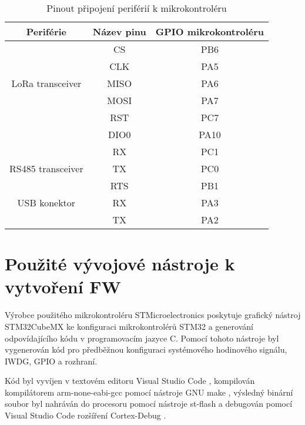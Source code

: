\begin{longtable}{ |c|c|c| }

                \caption{Pinout připojení periférií k mikrokontroléru}
                \label{table:Pinout připojení periférií k mikrokontroléru} \\
     \hline

     Periférie          & Název pinu & GPIO mikrokontroléru           \\ \hline \hline

                        & CS    &  PB6             \\
                        & CLK   &  PA5        \\
    LoRa transceiver    & MISO  &  PA6     \\
                        & MOSI  &  PA7        \\
                        & RST   & PC7          \\
                        & DIO0  & PA10         \\
                        \hline

                        & RX  &   PC1            \\
    RS485 transceiver   & TX  &   PC0       \\
                        & RTS  &  PB1      \\     \hline

    USB konektor        & RX    & PA3    \\
                        & TX    & PA2   \\          \hline


\end{longtable}



\section{Použité vývojové nástroje k vytvoření FW}
Výrobce použitého mikrokontroléru STMicroelectronics poskytuje grafický nástroj STM32CubeMX \cite{stm32cubemx} ke konfiguraci mikrokontrolérů STM32 a generování odpovídajícího kódu v programovacím jazyce C.
Pomocí tohoto nástroje byl vygenerován kód pro předběžnou konfiguraci systémového hodinového signálu, IWDG, GPIO a rozhraní.

Kód byl vyvíjen v textovém editoru Visual Studio Code \cite{vscode}, kompilován kompilátorem arm-none-eabi-gcc \cite{arm-none-eabi-gcc} pomocí nástroje GNU make \cite{makefile}, výsledný binární soubor byl nahráván do procesoru pomocí nástroje st-flash \cite{st-flash} a debugován pomocí Visual Studio Code rozšíření Cortex-Debug \cite{cortex-debug}.


